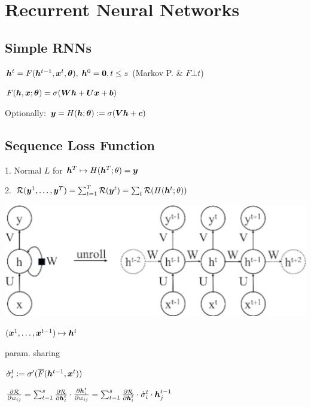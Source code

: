 \section{Recurrent Neural Networks}
\subsection*{Simple RNNs}
 $\boldsymbol{h}^t=F(\boldsymbol{h}^{t-1},\boldsymbol{x}^t,\boldsymbol{\theta}), \; \boldsymbol{h}^0=\boldsymbol{0},t\leq s$ (Markov P. \& $F\bot t$)

 $F(\boldsymbol{h},\boldsymbol{x};\boldsymbol{\theta})=\sigma(\boldsymbol{W}\boldsymbol{h}+\boldsymbol{U}\boldsymbol{x}+\boldsymbol{b})$

Optionally:
$\boldsymbol{y}=H(\boldsymbol{h};\boldsymbol{\theta}):=\sigma(\boldsymbol{V}\boldsymbol{h}+\boldsymbol{c})$

\subsection*{Sequence Loss Function}
 1. Normal $L$ for $\boldsymbol{h}^T\mapsto H(\boldsymbol{h}^T;\theta)=\boldsymbol{y}$

2. $\mathcal{R}(\boldsymbol{y}^1,\dots,\boldsymbol{y}^T)=\sum^T_{t=1} \mathcal{R}(\boldsymbol{y}^t)=\sum_{t} \mathcal{R}(H(\boldsymbol{h}^t;\theta))$

\begin{multicols}{2}
\includegraphics[width=\textwidth/8]{ETH-DS-2020/AML/Resources/unroll_rnn.png}

 $(\boldsymbol{x}^1,\dots,\boldsymbol{x}^{t-1})\mapsto\boldsymbol{h}^t$
\end{multicols}
 param. sharing

 $\dot{\sigma}_i^t:=\sigma'(\overline{F}(\boldsymbol{h}^{t-1},\boldsymbol{x}^t))$

$\frac{\partial\mathcal{R}}{\partial w_{ij}}=\sum^s_{t=1} \frac{\partial\mathcal{R}}{\partial \boldsymbol{h}^t_i}\cdot \frac{\partial\boldsymbol{h}^t_i}{\partial w_{ij}}=\sum^s_{t=1} \frac{\partial\mathcal{R}}{\partial \boldsymbol{h}^t_i}\cdot \dot{\sigma}_i^t \cdot \boldsymbol{h}^{t-1}_j$

